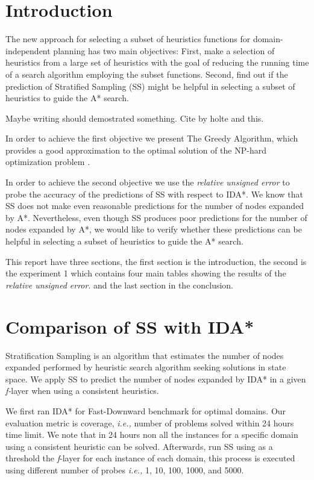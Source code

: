 \documentclass[a4paper,12pt]{article}
\begin{document}
\tableofcontents
\newpage

\section{Introduction}
The new approach for selecting a subset of heuristics functions for domain-independent planning has two main objectives: First, make a selection of heuristics from a large set of heuristics with the goal of reducing the running time of a search algorithm employing the subset functions. Second, find out if the prediction of Stratified Sampling (SS) might be helpful in selecting a subset of heuristics to guide the A* search.

Maybe writing \citep{krause2012submodular} should demostrated something.
Cite by holte \citep{holte2006maximizing} and this.

In order to achieve the first objective we present The Greedy Algorithm, which provides a good approximation to the optimal solution of the NP-hard optimization problem \citep{krause2012submodular}. 

In order to achieve the second objective we use the \textit{relative unsigned error} to probe the accuracy of the predictions of SS with respect to IDA*. We know that SS does not make even reasonable predictions for the number of nodes expanded by A*. Nevertheless, even though SS produces poor predictions for the number of nodes expanded by A*, we would like to verify whether these predictions can be helpful in selecting a subset of heuristics to guide the A* search.

This report have three sections, the first section is the introduction, the second is the experiment 1 which contains four main tables showing the results of the \textit{relative unsigned error}. and the last section in the conclusion.

\section{Comparison of SS with IDA*}
Stratification Sampling is an algorithm that estimates the number of nodes expanded performed by heuristic search algorithm seeking solutions in state space. We apply SS to predict the number of nodes expanded by IDA* in a given \textit{f-}layer when using a consistent heuristics.

We first ran IDA* for Fast-Downward benchmark for optimal domains. Our evaluation metric is coverage, \textit{i.e.,} number of problems solved within 24 hours time limit. We note that in 24 hours non all the instances for a specific domain using a consistent heuristic can be solved. Afterwards, run SS using as a threshold the \textit{f}-layer for each instance of each domain, this process is executed using different number of probes \textit{i.e.,} 1, 10, 100, 1000, and 5000. 
\end{document}
